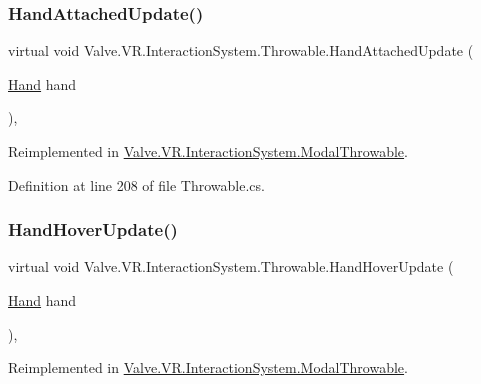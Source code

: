 \subsubsection{\texorpdfstring{HandAttachedUpdate()}{HandAttachedUpdate()}}
{\footnotesize\ttfamily virtual void Valve.\+V\+R.\+Interaction\+System.\+Throwable.\+Hand\+Attached\+Update (\begin{DoxyParamCaption}\item[{\mbox{\hyperlink{class_valve_1_1_v_r_1_1_interaction_system_1_1_hand}{Hand}}}]{hand }\end{DoxyParamCaption})\hspace{0.3cm}{\ttfamily [protected]}, {\ttfamily [virtual]}}



Reimplemented in \mbox{\hyperlink{class_valve_1_1_v_r_1_1_interaction_system_1_1_modal_throwable_ab8c2156660c359719f3bbee9e123530d}{Valve.\+V\+R.\+Interaction\+System.\+Modal\+Throwable}}.



Definition at line 208 of file Throwable.\+cs.

\mbox{\label{class_valve_1_1_v_r_1_1_interaction_system_1_1_throwable_a8a5523917812ed611fe385c195c8e55f}} 
\subsubsection{\texorpdfstring{HandHoverUpdate()}{HandHoverUpdate()}}
{\footnotesize\ttfamily virtual void Valve.\+V\+R.\+Interaction\+System.\+Throwable.\+Hand\+Hover\+Update (\begin{DoxyParamCaption}\item[{\mbox{\hyperlink{class_valve_1_1_v_r_1_1_interaction_system_1_1_hand}{Hand}}}]{hand }\end{DoxyParamCaption})\hspace{0.3cm}{\ttfamily [protected]}, {\ttfamily [virtual]}}



Reimplemented in \mbox{\hyperlink{class_valve_1_1_v_r_1_1_interaction_system_1_1_modal_throwable_abd5ac3a0dce76c872f6f4266c68c6a5b}{Valve.\+V\+R.\+Interaction\+System.\+Modal\+Throwable}}.



